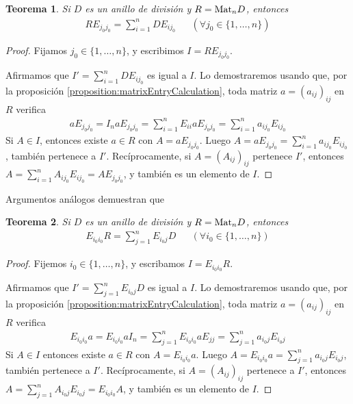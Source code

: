 \documentclass{report}
\newcommand{\Mat}{\textnormal{Mat}}
\newtheorem{theorem}{Teorema}
\begin{document}
  \begin{theorem}\label{theorem:matricesWhereAlmostEveryColumnIsNull}
    Si \(D\) es un anillo de división y \(R = \Mat_n D\), entonces 
    \begin{align}
      R E_{j_0 j_0}
      =
      \sum_{i = 1}^n D E_{i j_0}
      &&(\forall j_0 \in \{1, \dots, n\})
    \end{align}
  \end{theorem}
  \begin{proof}
    Fijamos \(j_0 \in \{1, \dots, n\}\), y escribimos \(I = R E_{j_0 j_0}\).

    Afirmamos que \(I' = \sum_{i = 1}^n D E_{i j_0}\) es igual a \(I\).
    Lo demostraremos usando que, por la proposición \ref{proposition:matrixEntryCalculation}, toda matriz \(a = {(a_{i j})}_{i j}\) en \(R\) verifica
    \begin{align}
      a E_{j_0 j_0}
      =
      I_n a E_{j_0 j_0}
      =
      \sum_{i = 1}^n E_{i i} a E_{j_0 j_0}
      =
      \sum_{i = 1}^n a_{i j_0} E_{i j_0}
    \end{align}
    Si \(A \in I\), entonces existe \(a \in R\) con \(A = a E_{j_0 j_0}\).
    Luego \(A = a E_{j_0 j_0} = \sum_{i = 1}^n a_{i j_0} E_{i j_0}\), también pertenece a \(I'\).
    Recíprocamente, si \(A = (A_{i j})_{i j}\) pertenece \(I'\), entonces \(A = \sum_{i = 1}^n A_{i j_0} E_{i j_0} = A E_{j_0 j_0}\), y también es un elemento de \(I\).
  \end{proof}

  Argumentos análogos demuestran que
  \begin{theorem}\label{theorem:matricesWhereAlmostEveryRowIsNull}
    Si \(D\) es un anillo de división y \(R = \Mat_n D\), entonces
    \begin{align}
      \displaystyle
      E_{i_0 i_0} R
      =
      \sum_{j = 1}^n E_{i_0 j} D
      &&(\forall i_0 \in \{1, \dots, n\})
    \end{align}
  \end{theorem}
  \begin{proof}
    Fijemos \(i_0 \in \{1, \dots, n\}\), y escribamos \(I = E_{i_0 i_0} R\).

    Afirmamos que \(I' = \sum_{j = 1}^n E_{i_0 j} D\) es igual a \(I\).
    Lo demostraremos usando que, por la proposición \ref{proposition:matrixEntryCalculation}, toda matriz \(a = (a_{i j})_{i j}\) en \(R\) verifica
    \begin{align}
      E_{i_0 i_0} a
      =
      E_{i_0 i_0} a I_n
      =
      \sum_{j = 1}^n E_{i_0 i_0} a E_{j j}
      =
      \sum_{j = 1}^n a_{i_0 j} E_{i_0 j}
    \end{align}
    Si \(A \in I\) entonces existe \(a \in R\) con \(A = E_{i_0 i_0} a\).
    Luego \(A = E_{i_0 i_0} a = \sum_{j = 1}^n a_{i_0 j} E_{i_0 j}\), también pertenece a \(I'\).
    Recíprocamente, si \(A = (A_{i j})_{i j}\) pertenece a \(I'\), entonces \(A = \sum_{j = 1}^n A_{i_0 j} E_{i_0 j} = E_{i_0 i_0} A\), y también es un elemento de \(I\).
  \end{proof}
\end{document}

